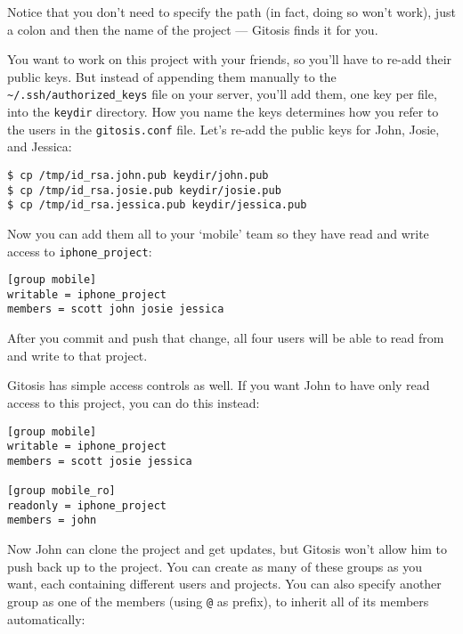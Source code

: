 \documentclass[a4paper]{book}
\newcounter{tab}[chapter]
\begin{document}
Notice that you don't need to specify the path (in fact, doing so won't work), just a colon and then the name of the project --- Gitosis finds it for you.

You want to work on this project with your friends, so you'll have to re-add their public keys. But instead of appending them manually to the \texttt{\textasciitilde{}/.ssh/authorized\_keys} file on your server, you'll add them, one key per file, into the \texttt{keydir} directory. How you name the keys determines how you refer to the users in the \texttt{gitosis.conf} file. Let's re-add the public keys for John, Josie, and Jessica:

\begin{shaded}\begin{verbatim}
$ cp /tmp/id_rsa.john.pub keydir/john.pub
$ cp /tmp/id_rsa.josie.pub keydir/josie.pub
$ cp /tmp/id_rsa.jessica.pub keydir/jessica.pub
\end{verbatim}\end{shaded}

Now you can add them all to your `mobile' team so they have read and write access to \texttt{iphone\_project}:

\begin{shaded}\begin{verbatim}
[group mobile]
writable = iphone_project
members = scott john josie jessica
\end{verbatim}\end{shaded}

After you commit and push that change, all four users will be able to read from and write to that project.

Gitosis has simple access controls as well. If you want John to have only read access to this project, you can do this instead:

\begin{shaded}\begin{verbatim}
[group mobile]
writable = iphone_project
members = scott josie jessica

[group mobile_ro]
readonly = iphone_project
members = john
\end{verbatim}\end{shaded}

Now John can clone the project and get updates, but Gitosis won't allow him to push back up to the project. You can create as many of these groups as you want, each containing different users and projects. You can also specify another group as one of the members (using \texttt{@} as prefix), to inherit all of its members automatically:
\end{document}
